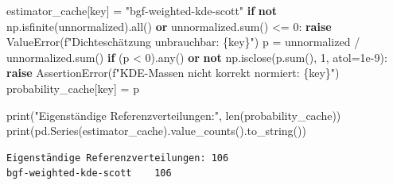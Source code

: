 \documentclass[
  ngerman,
  a4paper,
  DIV=11]{scrreprt}
\newenvironment{Shaded}{\begin{snugshade}}{\end{snugshade}}
\newcommand{\BuiltInTok}[1]{\textcolor[rgb]{0.00,0.23,0.31}{#1}}
\newcommand{\ControlFlowTok}[1]{\textcolor[rgb]{0.00,0.23,0.31}{\textbf{#1}}}
\newcommand{\DecValTok}[1]{\textcolor[rgb]{0.68,0.00,0.00}{#1}}
\newcommand{\FloatTok}[1]{\textcolor[rgb]{0.68,0.00,0.00}{#1}}
\newcommand{\KeywordTok}[1]{\textcolor[rgb]{0.00,0.23,0.31}{\textbf{#1}}}
\newcommand{\NormalTok}[1]{\textcolor[rgb]{0.00,0.23,0.31}{#1}}
\newcommand{\OperatorTok}[1]{\textcolor[rgb]{0.37,0.37,0.37}{#1}}
\newcommand{\PreprocessorTok}[1]{\textcolor[rgb]{0.68,0.00,0.00}{#1}}
\newcommand{\SpecialCharTok}[1]{\textcolor[rgb]{0.37,0.37,0.37}{#1}}
\newcommand{\SpecialStringTok}[1]{\textcolor[rgb]{0.13,0.47,0.30}{#1}}
\newcommand{\StringTok}[1]{\textcolor[rgb]{0.13,0.47,0.30}{#1}}
\begin{document}
\begin{Shaded}
\begin{Highlighting}[]
\NormalTok{        estimator\_cache[key] }\OperatorTok{=} \StringTok{"bgf{-}weighted{-}kde{-}scott"}
    \ControlFlowTok{if} \KeywordTok{not}\NormalTok{ np.isfinite(unnormalized).}\BuiltInTok{all}\NormalTok{() }\KeywordTok{or}\NormalTok{ unnormalized.}\BuiltInTok{sum}\NormalTok{() }\OperatorTok{\textless{}=} \DecValTok{0}\NormalTok{:}
        \ControlFlowTok{raise} \PreprocessorTok{ValueError}\NormalTok{(}\SpecialStringTok{f"Dichteschätzung unbrauchbar: }\SpecialCharTok{\{}\NormalTok{key}\SpecialCharTok{\}}\SpecialStringTok{"}\NormalTok{)}
\NormalTok{    p }\OperatorTok{=}\NormalTok{ unnormalized }\OperatorTok{/}\NormalTok{ unnormalized.}\BuiltInTok{sum}\NormalTok{()}
    \ControlFlowTok{if}\NormalTok{ (p }\OperatorTok{\textless{}} \DecValTok{0}\NormalTok{).}\BuiltInTok{any}\NormalTok{() }\KeywordTok{or} \KeywordTok{not}\NormalTok{ np.isclose(p.}\BuiltInTok{sum}\NormalTok{(), }\DecValTok{1}\NormalTok{, atol}\OperatorTok{=}\FloatTok{1e{-}9}\NormalTok{):}
        \ControlFlowTok{raise} \PreprocessorTok{AssertionError}\NormalTok{(}\SpecialStringTok{f"KDE{-}Massen nicht korrekt normiert: }\SpecialCharTok{\{}\NormalTok{key}\SpecialCharTok{\}}\SpecialStringTok{"}\NormalTok{)}
\NormalTok{    probability\_cache[key] }\OperatorTok{=}\NormalTok{ p}

\BuiltInTok{print}\NormalTok{(}\StringTok{"Eigenständige Referenzverteilungen:"}\NormalTok{, }\BuiltInTok{len}\NormalTok{(probability\_cache))}
\BuiltInTok{print}\NormalTok{(pd.Series(estimator\_cache).value\_counts().to\_string())}
\end{Highlighting}
\end{Shaded}

\begin{verbatim}
Eigenständige Referenzverteilungen: 106
bgf-weighted-kde-scott    106
\end{verbatim}
\end{document}
